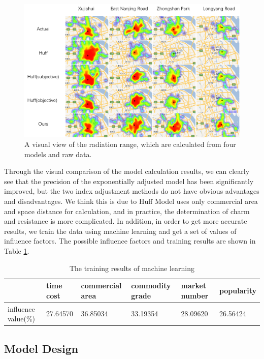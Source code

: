 \documentclass[journal,transmag]{IEEEtran}
\begin{document}
\begin{figure}[tb]
\centering
\includegraphics[width=1.8\columnwidth]{figure4.png}
\caption{A visual view of the radiation range, which are calculated from four models and raw data.}
\label{fig:Five-model-compare}
\end{figure}

Through the visual comparison of the model calculation results, we can clearly see that the precision of the exponentially adjusted model has been significantly improved, but the two index adjustment methods do not have obvious advantages and disadvantages. We think this is due to Huff Model uses only commercial area and space distance for calculation, and in practice, the determination of charm and resistance is more complicated. In addition, in order to get more accurate results, we train the data using machine learning and get a set of values of influence factors. The possible influence factors and training results are shown in Table \ref{tab:machine-learning}.

\begin{table}[ht]
\centering
\normalsize
\caption{The training results of machine learning}
\begin{tabular}{|l|l|l|l|l|l|}\hline
       &time cost&commercial area&commodity grade&market number&popularity\\\hline
      influence value(\%)&27.64570&36.85034&33.19354&28.09620&26.56424\\
      \hline
\end{tabular}
\label{tab:machine-learning}
\end{table}



\subsection{Model Design}
\end{document}
